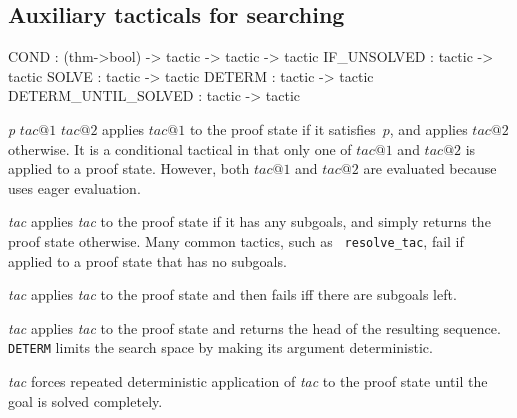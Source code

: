 \subsection{Auxiliary tacticals for searching}
\begin{ttbox} 
COND                : (thm->bool) -> tactic -> tactic -> tactic
IF_UNSOLVED         : tactic -> tactic
SOLVE               : tactic -> tactic
DETERM              : tactic -> tactic
DETERM_UNTIL_SOLVED : tactic -> tactic
\end{ttbox}
\begin{ttdescription}
\item[\ttindexbold{COND} {\it p} $tac@1$ $tac@2$] 
applies $tac@1$ to the proof state if it satisfies~$p$, and applies $tac@2$
otherwise.  It is a conditional tactical in that only one of $tac@1$ and
$tac@2$ is applied to a proof state.  However, both $tac@1$ and $tac@2$ are
evaluated because \ML{} uses eager evaluation.

\item[\ttindexbold{IF_UNSOLVED} {\it tac}] 
applies {\it tac\/} to the proof state if it has any subgoals, and simply
returns the proof state otherwise.  Many common tactics, such as {\tt
resolve_tac}, fail if applied to a proof state that has no subgoals.

\item[\ttindexbold{SOLVE} {\it tac}] 
applies {\it tac\/} to the proof state and then fails iff there are subgoals
left.

\item[\ttindexbold{DETERM} {\it tac}] 
applies {\it tac\/} to the proof state and returns the head of the
resulting sequence.  {\tt DETERM} limits the search space by making its
argument deterministic.

\item[\ttindexbold{DETERM_UNTIL_SOLVED} {\it tac}] 
forces repeated deterministic application of {\it tac\/} to the proof state 
until the goal is solved completely.
\end{ttdescription}


